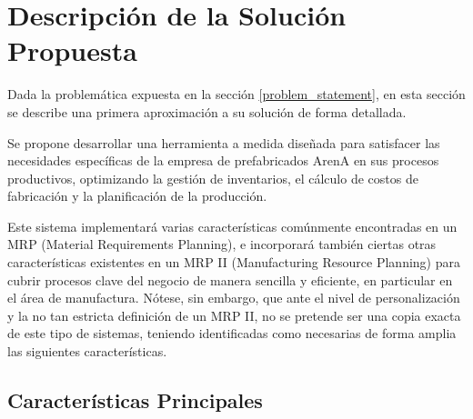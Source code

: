 \section{Descripción de la Solución Propuesta}
Dada la problemática expuesta en la sección \ref{problem_statement}, en esta sección
se describe una primera aproximación a su solución de forma detallada.

Se propone desarrollar una herramienta a medida diseñada para satisfacer las necesidades específicas de la empresa de prefabricados ArenA en sus procesos productivos,
optimizando la gestión de inventarios, el cálculo de costos de fabricación y la planificación de la producción.

Este sistema implementará varias características comúnmente encontradas en un MRP (Material Requirements Planning), e incorporará también ciertas otras características existentes en un 
MRP II (Manufacturing Resource Planning) para cubrir procesos clave del negocio de manera sencilla y eficiente, en particular en el área de manufactura. 
Nótese, sin embargo, que ante el nivel de personalización y la no tan estricta definición de un MRP II, no se pretende ser una copia exacta de este tipo de sistemas, teniendo identificadas como necesarias de forma amplia las siguientes características.

\subsection{Características Principales}

